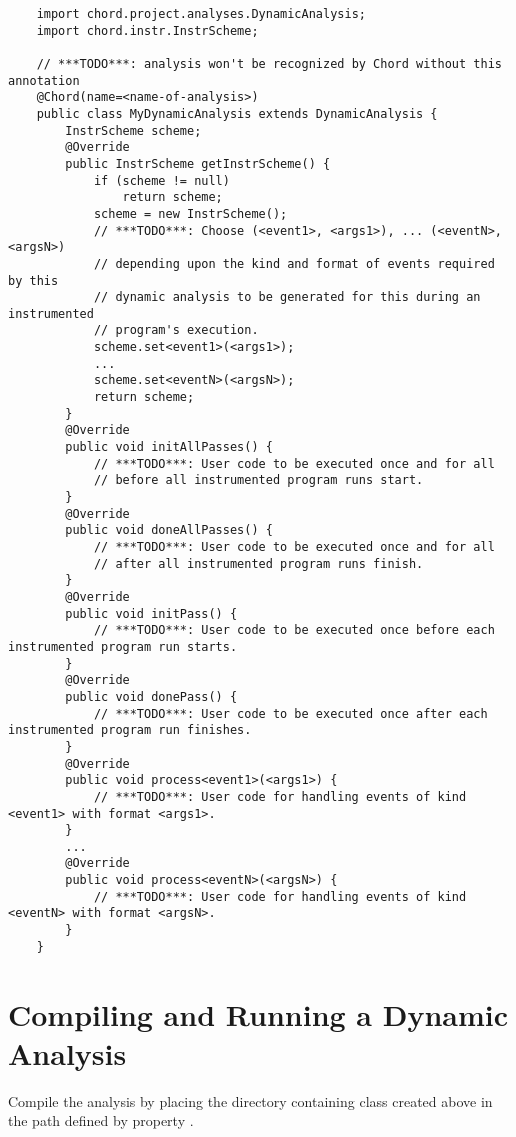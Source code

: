 \begin{framed}
{\small
\begin{verbatim}
    import chord.project.analyses.DynamicAnalysis;
    import chord.instr.InstrScheme;

    // ***TODO***: analysis won't be recognized by Chord without this annotation
    @Chord(name=<name-of-analysis>)    
    public class MyDynamicAnalysis extends DynamicAnalysis {
        InstrScheme scheme;
        @Override
        public InstrScheme getInstrScheme() {
            if (scheme != null)
                return scheme;
            scheme = new InstrScheme();
            // ***TODO***: Choose (<event1>, <args1>), ... (<eventN>, <argsN>)
            // depending upon the kind and format of events required by this
            // dynamic analysis to be generated for this during an instrumented
            // program's execution.
            scheme.set<event1>(<args1>);
            ...
            scheme.set<eventN>(<argsN>);
            return scheme;
        }
        @Override
        public void initAllPasses() {
            // ***TODO***: User code to be executed once and for all
            // before all instrumented program runs start.
        }
        @Override
        public void doneAllPasses() {
            // ***TODO***: User code to be executed once and for all
            // after all instrumented program runs finish.
        }
        @Override
        public void initPass() {
            // ***TODO***: User code to be executed once before each instrumented program run starts.
        }
        @Override
        public void donePass() {
            // ***TODO***: User code to be executed once after each instrumented program run finishes.
        }
        @Override
        public void process<event1>(<args1>) {
            // ***TODO***: User code for handling events of kind <event1> with format <args1>.
        }
        ...
        @Override
        public void process<eventN>(<argsN>) {
            // ***TODO***: User code for handling events of kind <eventN> with format <argsN>.
        }
    }
\end{verbatim}
}
\end{framed}

\section{Compiling and Running a Dynamic Analysis}
\label{sec:running-dynamic-analysis}

Compile the analysis by placing the directory containing class  created
above in the path defined by property .

